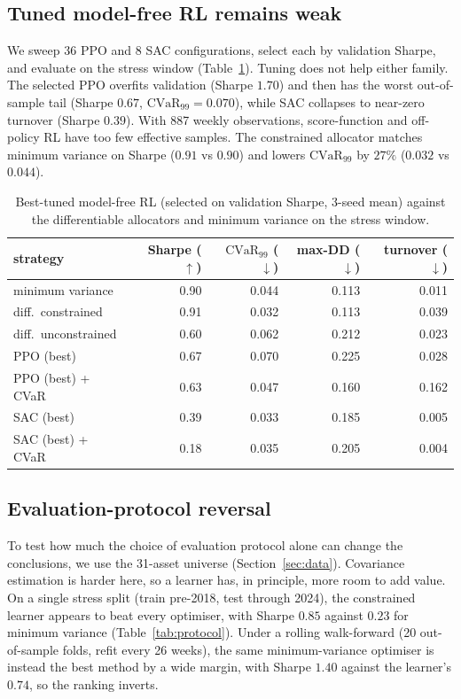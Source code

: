 \documentclass[sigconf]{acmart}
\begin{document}
\subsection{Tuned model-free RL remains weak}
\label{sec:modelfree}
We sweep 36 PPO and 8 SAC configurations, select each by validation Sharpe, and
evaluate on the stress window (Table~\ref{tab:modelfree}). Tuning does not help either family.
The selected PPO overfits validation (Sharpe $1.70$) and then has the worst out-of-sample
tail (Sharpe $0.67$, $\mathrm{CVaR}_{99}=0.070$), while SAC collapses to near-zero turnover
(Sharpe $0.39$). With 887 weekly observations, score-function and
off-policy RL have too few effective samples. The constrained allocator matches minimum
variance on Sharpe ($0.91$ vs $0.90$) and lowers $\mathrm{CVaR}_{99}$ by $27\%$ ($0.032$ vs
$0.044$).

\begin{table}[t]
\centering
\caption{Best-tuned model-free RL (selected on validation Sharpe, 3-seed mean) against the differentiable allocators and minimum variance on the stress window.}
\label{tab:modelfree}
\footnotesize
\begin{tabular}{lrrrr}
\toprule
strategy & Sharpe ($\uparrow$) & $\mathrm{CVaR}_{99}$ ($\downarrow$) & max-DD ($\downarrow$) & turnover ($\downarrow$) \\
\midrule
minimum variance        & 0.90 & 0.044 & 0.113 & 0.011 \\
diff.\ constrained & 0.91 & 0.032 & 0.113 & 0.039 \\
diff.\ unconstrained    & 0.60 & 0.062 & 0.212 & 0.023 \\
PPO (best)              & 0.67 & 0.070 & 0.225 & 0.028 \\
PPO (best) + CVaR       & 0.63 & 0.047 & 0.160 & 0.162 \\
SAC (best)              & 0.39 & 0.033 & 0.185 & 0.005 \\
SAC (best) + CVaR       & 0.18 & 0.035 & 0.205 & 0.004 \\
\bottomrule
\end{tabular}
\end{table}

\subsection{Evaluation-protocol reversal}
\label{sec:protocol}
To test how much the choice of evaluation protocol alone can change the conclusions, we
use the 31-asset universe (Section~\ref{sec:data}). Covariance estimation is harder here, so a learner has, in principle, more
room to add value. On a single stress split (train pre-2018, test through 2024), the constrained
learner appears to beat every optimiser, with Sharpe $0.85$ against $0.23$ for minimum
variance (Table~\ref{tab:protocol}). Under a rolling walk-forward (20 out-of-sample folds, refit
every 26 weeks), the same minimum-variance optimiser is instead the best method by a
wide margin, with Sharpe $1.40$ against the learner's $0.74$, so the ranking inverts.
\end{document}
